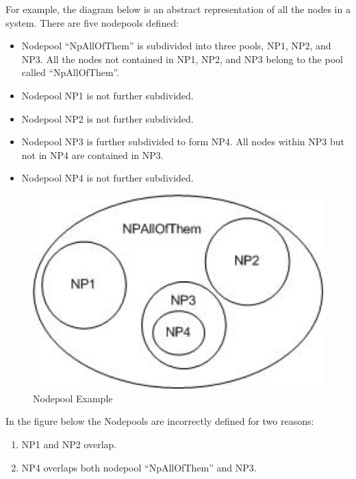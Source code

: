     For example, the diagram below is an abstract representation of all the nodes in a
    system.  There are five nodepools defined:
    \begin{itemize}
      \item Nodepool ``NpAllOfThem'' is subdivided into three pools, NP1, NP2, and NP3.  All
        the nodes not contained in NP1, NP2, and NP3 belong to the pool called ``NpAllOfThem''.
      \item Nodepool NP1 is not further subdivided.
      \item Nodepool NP2 is not further subdivided.
      \item Nodepool NP3 is further subdivided to form NP4.  All nodes within NP3 but
        not in NP4 are contained in NP3.
      \item Nodepool NP4 is not further subdivided.
    \end{itemize}

    \begin{figure}[H]
      \centering
      \includegraphics[bb=0 0 241 161, width=5.5in]{images/Nodepool1.jpg}
      \caption{Nodepool Example}
      \label{fig:Nodepools1}
    \end{figure}

    In the figure below the Nodepools are incorrectly defined for two reasons:
    \begin{enumerate}
       \item NP1 and NP2 overlap.
       \item NP4 overlaps both nodepool ``NpAllOfThem'' and NP3.
    \end{enumerate}
    
